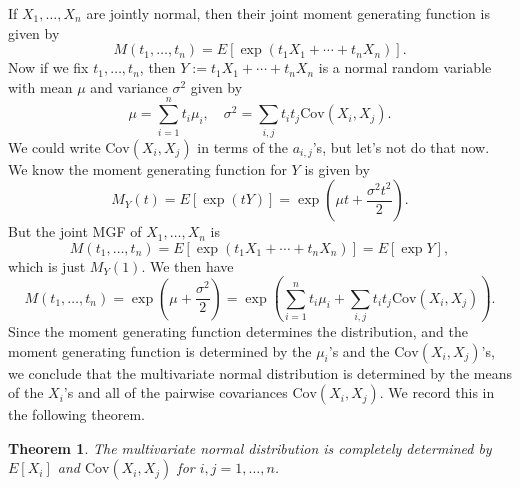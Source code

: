 \documentclass[12pt]{article}
\theoremstyle{plain}
\newtheorem{theorem}{Theorem}[section]
\theoremstyle{definition}
\theoremstyle{remark}
\newcommand{\Cov}{\ensuremath{\textrm{Cov}}}
\begin{document}
If $X_1, \ldots, X_n$ are jointly normal, then their joint moment generating function is given by
\[
    M(t_1, \ldots, t_n) = E[\exp(t_1X_1 + \cdots + t_nX_n)].
\]
Now if we fix $t_1, \ldots, t_n$, then $Y:= t_1X_1 + \cdots + t_nX_n$ is a normal random variable with mean $\mu$ and variance $\sigma^2$ given by
\[
    \mu = \sum_{i=1}^nt_i\mu_i,\quad \sigma^2 = \sum_{i,j}t_it_j\Cov(X_i,X_j).
\]
We could write $\Cov(X_i,X_j)$ in terms of the $a_{i,j}$'s, but let's not do that now.
We know the moment generating function for $Y$ is given by
\[
    M_Y(t) = E[\exp(tY)] =  \exp\left(\mu t + \frac{\sigma^2t^2}{2}\right).
\]
But the joint MGF of $X_1, \ldots, X_n$ is
\[
    M(t_1, \ldots, t_n) = E[\exp(t_1X_1 + \cdots + t_nX_n)] = E[\exp Y],
\]
which is just $M_Y(1)$.
We then have
\[
    M(t_1, \ldots, t_n) = \exp\left(\mu  + \frac{\sigma^2}{2}\right) = \exp\left(\sum_{i=1}^nt_i\mu_i + \sum_{i,j}t_it_j\Cov(X_i,X_j)\right). 
\]
Since the moment generating function determines the distribution, and the moment generating function is determined by the $\mu_i$'s and the $\Cov(X_i,X_j)$'s, we conclude that the multivariate normal distribution is determined by the means of the $X_i$'s and all of the pairwise covariances $\Cov(X_i, X_j)$.
We record this in the following theorem.
\begin{theorem}
    The multivariate normal distribution is completely determined by $E[X_i]$ and $\Cov(X_i, X_j)$ for $i,j = 1, \ldots, n$.
\end{theorem}
\end{document}
